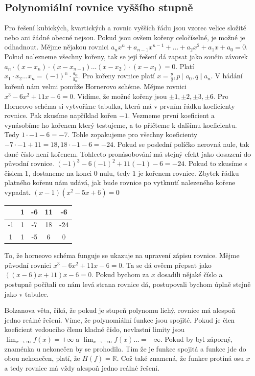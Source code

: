 \documentclass[12pt]{article}
\begin{document}
\subsection*{Polynomiální rovnice vyššího stupně}
Pro řešení kubických, kvartických a rovnic vyšších řádu jsou vzorec velice složité nebo ani žádné
obecné nejsou. Pokud jsou ovšem kořeny celočíselné, je možné
je odhadnout. Mějme nějakou rovnici $a_nx^n + a_{n-1}x^{n-1} + \dots + a_2x^2 + a_1x + a_0 = 0$.
Pokud nalezneme všechny kořeny, tak se její řešení dá zapsat jako součin závorek $a_n \cdot (x - x_n)
\cdot (x - x_{n-1}) \dots (x - x_2) \cdot (x - x_1) = 0$.
Platí $x_1 \cdot x_2 \dots x_n = (-1)^n \cdot \frac{a_0}{a_n}$. Pro kořeny rovnice platí $x =
\frac{p}{q}, p \mid a_0, q \mid a_n$. V hádání kořenů nám velmi pomůže Hornerovo schéme.
Mějme rovnici $x^3 - 6x^2 + 11x - 6 = 0$.
Vidíme, že možné kořeny jsou $\pm 1, \pm 2, \pm 3, \pm 6$. Pro Horneovo schéma si
vytvoříme tabulka, která má v prvním řádku koeficienty rovnice. Pak zkusíme například kořen $-1$.
Vezmeme první koeficient a vynásobíme ho kořenem který testujeme, a to přičteme k dalšímu
koeficientu. Tedy $1 \cdot -1 - 6 = - 7$. Tohle zopakujeme pro všechny koeficienty $-7 \cdot -1 + 11
= 18, 18 \cdot -1 - 6 = -24$. Pokud se poslední políčko nerovná nule, tak dané číslo není kořenem.
Tohlecto pronásobování má stejný efekt jako dosazení do původní rovnice. $(-1)^3 -6(-1)^2 + 11(-1) -
6 = -24$. Pokud to zkusíme s číslem $1$, dostaneme na konci 0 nulu, tedy $1$ je kořenem rovnice.
Zbytek řádku platného kořenu nám udává, jak bude rovnice po vytknutí nalezeného kořene vypadat.
$(x-1)(x^2 -5x + 6) = 0$
\begin{center}
\begin{tabular}{|c|c|c|c|c|}
\hline
 & 1 & -6 & 11 & -6 \\
\hline
-1 & 1 & -7 & 18 & -24 \\
\hline
1 & 1 & -5 & 6 & 0 \\
\hline
\end{tabular}
\end{center}
To, že horneovo schéma funguje se ukazuje na upravení zápisu rovnice. Mějme původní rovnici $x^3
-6x^2 + 11x - 6 = 0$. Ta se dá ověem přepsat jako $((x - 6)x + 11)x -6 = 0$. Pokud bychom za $x$
dosadili nějaké číslo a postupně počítali co nám levá strana rovnice dá, postupovali bychom úplně
stejně jako v tabulce.

Bolzanova věta, říká, že pokud je stupeň polynomu lichý, rovnice má alespoň jedno reálné
řešení. Víme, že polynomiální funkce jsou spojité. Pokud je člen koeficient vedoucího členu
kladné číslo, nevlastní limity jsou $\lim_{x \to \infty} f(x) = +\infty$ a $\lim_{x \to
-\infty} f(x) \dots = -\infty$. Pokud by byl záporný, znaménka u nekonečen by se prohodila.
Tím že je funkce spojitá a funkce jde do obou nekonečen, platí, že $H(f) = \mathbb{R}$. Což také
znamená, že funkce protíná osu $x$ a tedy rovnice má vždy alespoň jedno reálné řešení.
\end{document}

